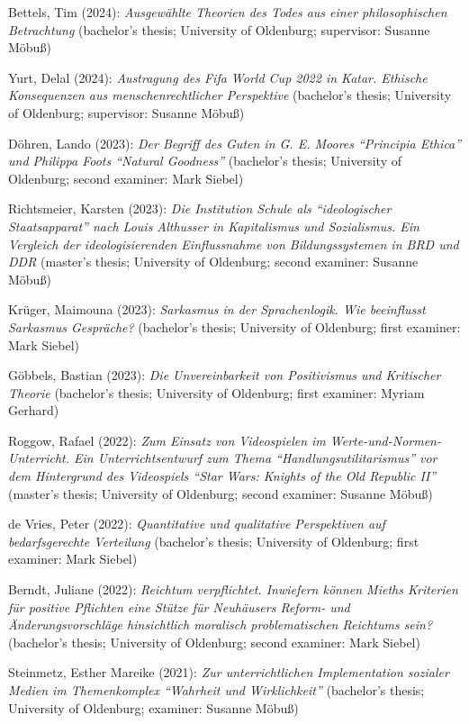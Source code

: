 \documentclass[a4paper,10pt]{article}
\newenvironment{literature}{%
   \parskip6pt\parindent0pt\raggedright
   \def\lititem{\hangindent=1cm\hangafter1}}{%
   \par\ignorespaces}
\begin{document}
\begin{literature}
\lititem Bettels, Tim (2024): \textit{Ausgewählte Theorien des Todes aus einer philosophischen Betrachtung} (bachelor's thesis; University of Oldenburg; supervisor: Susanne Möbuß)

\lititem Yurt, Delal (2024): \textit{Austragung des Fifa World Cup 2022 in Katar. Ethische Konsequenzen aus menschenrechtlicher Perspektive} (bachelor's thesis; University of Oldenburg; supervisor: Susanne Möbuß)

\lititem Döhren, Lando (2023): \textit{Der Begriff des Guten in G. E. Moores \enquote{Principia Ethica} und Philippa Foots \enquote{Natural Goodness}} (bachelor's thesis; University of Oldenburg; second examiner: Mark Siebel)

\lititem Richtsmeier, Karsten (2023): \textit{Die Institution Schule als \enquote{ideologischer Staatsapparat} nach Louis Althusser in Kapitalismus und Sozialismus. Ein Vergleich der ideologisierenden Einflussnahme von Bildungssystemen in BRD und DDR} (master's thesis; University of Oldenburg; second examiner: Susanne Möbuß)

\lititem Krüger, Maimouna (2023): \textit{Sarkasmus in der Sprachenlogik. Wie beeinflusst Sarkasmus Gespräche?} (bachelor's thesis; University of Oldenburg; first examiner: Mark Siebel)

\lititem Göbbels, Bastian (2023): \textit{Die Unvereinbarkeit von Positivismus und Kritischer Theorie} (bachelor's thesis; University of Oldenburg; first examiner: Myriam Gerhard)

\lititem Roggow, Rafael (2022): \textit{Zum Einsatz von Videospielen im Werte-und-Normen-Unterricht. Ein Unterrichtsentwurf zum Thema \enquote{Handlungsutilitarismus} vor dem Hintergrund des Videospiels \enquote{Star Wars: Knights of the Old Republic II}} (master's thesis; University of Oldenburg; second examiner: Susanne Möbuß)

\lititem de Vries, Peter (2022): \textit{Quantitative und qualitative Perspektiven auf bedarfsgerechte Verteilung} (bachelor's thesis; University of Oldenburg; first examiner: Mark Siebel)

\lititem Berndt, Juliane (2022): \textit{Reichtum verpflichtet. Inwiefern können Mieths Kriterien für positive Pflichten eine Stütze für Neuhäusers Reform- und Änderungsvorschläge hinsichtlich moralisch problematischen Reichtums sein?} (bachelor's thesis; University of Oldenburg; second examiner: Mark Siebel)

\lititem Steinmetz, Esther Mareike (2021): \textit{Zur unterrichtlichen Implementation sozialer Medien im Themenkomplex \enquote{Wahrheit und Wirklichkeit}} (bachelor's thesis; University of Oldenburg; examiner: Susanne Möbuß)


\end{literature}
\end{document}
